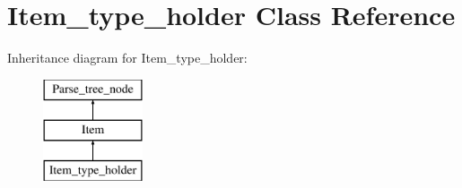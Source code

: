 \hypertarget{classItem__type__holder}{}\section{Item\+\_\+type\+\_\+holder Class Reference}
\label{classItem__type__holder}
Inheritance diagram for Item\+\_\+type\+\_\+holder\+:\begin{figure}[H]
\begin{center}
\leavevmode
\includegraphics[height=3.000000cm]{classItem__type__holder}
\end{center}
\end{figure}
